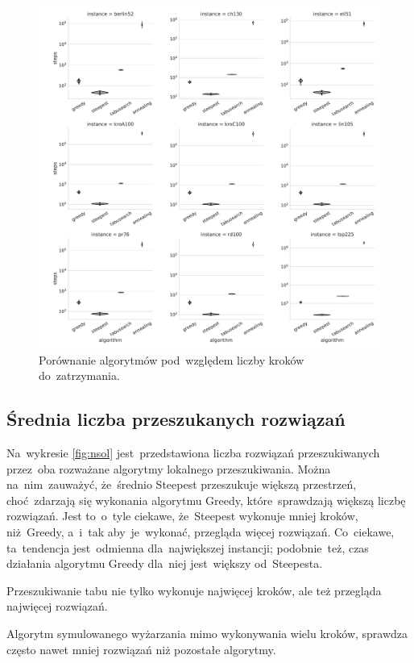 \begin{figure}[H]
\begin{center}
\includegraphics[width=1.0\textwidth]{graphs/steps_comparison_violin.pdf}
\end{center}
\caption{Porównanie algorytmów pod~względem liczby kroków do~zatrzymania.}
\label{fig:steps}
\end{figure}

\subsection{Średnia liczba przeszukanych rozwiązań}

Na~wykresie \ref{fig:nsol} jest~przedstawiona liczba rozwiązań przeszukiwanych przez~oba rozważane algorytmy lokalnego przeszukiwania. Można na~nim~zauważyć, że~średnio Steepest przeszukuje większą przestrzeń, choć~zdarzają się wykonania algorytmu Greedy, które~sprawdzają większą liczbę rozwiązań. Jest to~o~tyle ciekawe, że~Steepest wykonuje mniej kroków, niż~Greedy, a~i~tak aby~je~wykonać, przegląda więcej rozwiązań. Co~ciekawe, ta~tendencja jest~odmienna dla~największej instancji; podobnie~też, czas działania algorytmu Greedy dla~niej jest~większy od~Steepesta.

{\color{part2}
Przeszukiwanie tabu nie tylko wykonuje najwięcej kroków, ale też przegląda najwięcej rozwiązań.

Algorytm symulowanego wyżarzania mimo wykonywania wielu kroków, sprawdza często nawet mniej rozwiązań niż pozostałe algorytmy.
}

